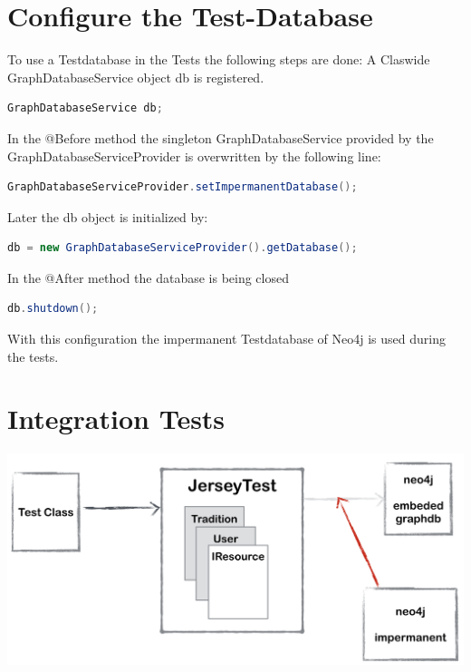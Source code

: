 \documentclass[11pt,fleqn,openany]{book} %
\begin{document}

\chapter{Configure the Test-Database}

To use a Testdatabase in the Tests the following steps are done:
A Claswide GraphDatabaseService object db is registered.

\begin{lstlisting}[language=java]
    GraphDatabaseService db;
\end{lstlisting}
In the @Before method the singleton GraphDatabaseService provided by the GraphDatabaseServiceProvider is overwritten by the following line:

\begin{lstlisting}[language=java]
    GraphDatabaseServiceProvider.setImpermanentDatabase();
\end{lstlisting}
Later the db object is initialized by:
\begin{lstlisting}[language=java]
    db = new GraphDatabaseServiceProvider().getDatabase();
\end{lstlisting}
In the @After method the database is being closed
\begin{lstlisting}[language=java]
    db.shutdown();
\end{lstlisting}
With this configuration the impermanent Testdatabase of Neo4j is used during the tests. 


\chapter{Integration Tests}

\begin{center}
\includegraphics[scale=.4]{Pictures/jerseytestoverview.png} 
\end{center}
\end{document}
